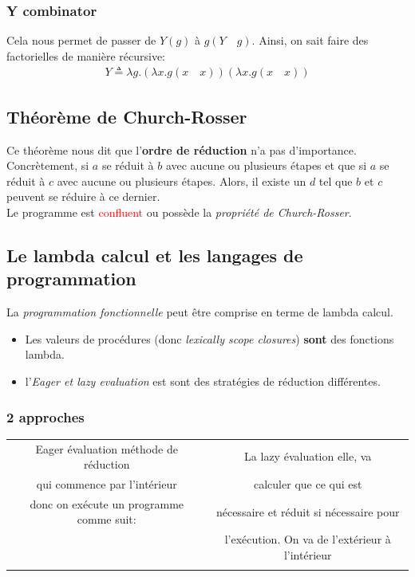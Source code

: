 \documentclass{report}
\begin{document}
\subsubsection{Y combinator}
Cela nous permet de passer de $Y(g)$ à $g(Y \quad g)$. Ainsi, on sait faire des factorielles de manière récursive:
\begin{align*}
Y \triangleq \lambda g.(\lambda x.g (x \quad x)) (\lambda x.g(x \quad x))
\end{align*}

\subsection{Théorème de Church-Rosser}
Ce théorème nous dit que l'\textbf{ordre de réduction} n'a pas d'importance.\\
Concrètement, si $a$ se réduit à $b$ avec aucune ou plusieurs étapes et que si $a$ se réduit à $c$ avec aucune ou plusieurs étapes. Alors, il existe un $d$ tel que $b$ et $c$ peuvent se réduire à ce dernier.\\
Le programme est \textcolor{red}{confluent} ou possède la \textit{propriété de Church-Rosser}.

\subsection{Le lambda calcul et les langages de programmation}
La \textit{programmation fonctionnelle} peut être comprise en terme de lambda calcul.
\begin{itemize}
\item Les valeurs de procédures (donc \textit{lexically scope closures}) \textbf{sont} des fonctions lambda.
\item l'\textit{Eager et lazy evaluation} est sont des stratégies de réduction différentes.
\end{itemize}

\subsubsection{2 approches}
\begin{tabular}{|c|c|}
Eager évaluation méthode de réduction & La lazy évaluation elle, va\\
qui commence par l'intérieur & calculer que ce qui est \\
 donc on exécute un programme comme suit: &  nécessaire et réduit si nécessaire pour \\
 & l'exécution. On va de l'extérieur à l'intérieur\\
  & 
\end{tabular}
\end{document}

